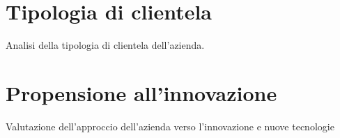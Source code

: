 
\section{Tipologia di clientela}
Analisi della tipologia di clientela dell'azienda.

\section{Propensione all'innovazione}
Valutazione dell'approccio dell'azienda verso l'innovazione e nuove tecnologie


    
    
    

